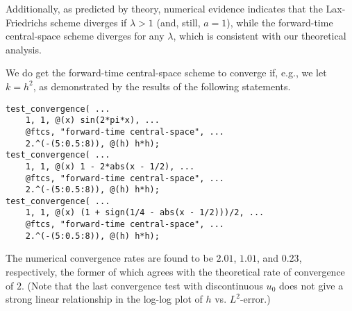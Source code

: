 \documentclass{article}
\begin{document}
\begin{itemize}
Additionally, as predicted by theory, numerical evidence indicates that the Lax-Friedrichs scheme diverges if $\lambda > 1$ (and, still, $a = 1$), while the forward-time central-space scheme diverges for any $\lambda$, which is consistent with our theoretical analysis.

We do get the forward-time central-space scheme to converge if, e.g., we let $k = h^2$, as demonstrated by the results of the following statements.

\begin{verbatim}
test_convergence( ...
    1, 1, @(x) sin(2*pi*x), ...
    @ftcs, "forward-time central-space", ...
    2.^(-(5:0.5:8)), @(h) h*h);
test_convergence( ...
    1, 1, @(x) 1 - 2*abs(x - 1/2), ...
    @ftcs, "forward-time central-space", ...
    2.^(-(5:0.5:8)), @(h) h*h);
test_convergence( ...
    1, 1, @(x) (1 + sign(1/4 - abs(x - 1/2)))/2, ...
    @ftcs, "forward-time central-space", ...
    2.^(-(5:0.5:8)), @(h) h*h);
\end{verbatim}

The numerical convergence rates are found to be $2.01$, $1.01$, and $0.23$, respectively, the former of which agrees with the theoretical rate of convergence of $2$. (Note that the last convergence test with discontinuous $u_0$ does not give a strong linear relationship in the log-log plot of $h$ vs. $L^2$-error.)

\end{itemize}
\end{document}

